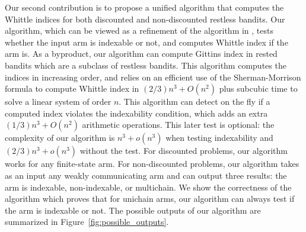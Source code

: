Our second contribution is to propose a unified algorithm that computes the Whittle indices for both discounted and non-discounted restless bandits. Our algorithm, which can be viewed as a refinement of the algorithm in \cite{akbarzadeh2020conditions}, tests whether the input arm is indexable or not, and computes Whittle index if the arm is. As a byproduct, our algorithm can compute Gittins index in rested bandits which are a subclass of restless bandits.  This algorithm computes the indices in increasing order, and relies on an efficient use of the Sherman-Morrison formula to compute Whittle index in $(2/3)n^3 + O(n^2)$ plus subcubic time \cite{strassen1969gaussian} to solve a linear system of order $n$.
This algorithm can detect on the fly if a computed index violates the indexability condition, which adds an extra $(1/3)n^3+O(n^2)$ arithmetic operations. This later test is optional: the complexity of our algorithm is $n^3+o(n^3)$ when testing indexability and $(2/3)n^3 +o(n^3)$ without the test. For discounted problems, our algorithm works for any finite-state arm.  For non-discounted problems, our algorithm takes as an input any weakly communicating arm and can output three results: the arm is indexable, non-indexable, or multichain. %
We show the correctness of the algorithm which proves that for unichain arms, our algorithm can always test if the arm is indexable or not. The possible outputs of our algorithm are summarized in Figure~\ref{fig:possible_outputs}.

